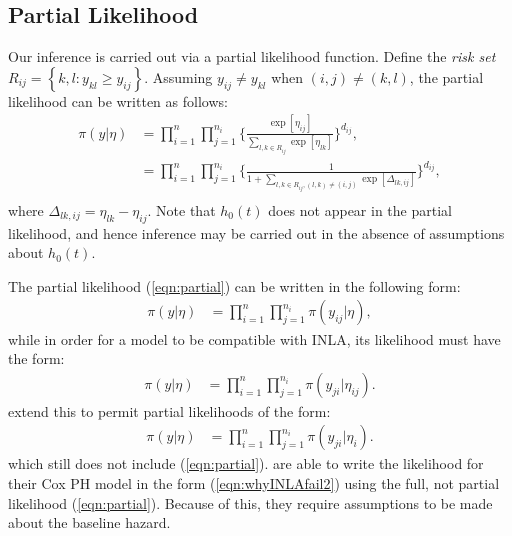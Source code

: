 \documentclass[ba]{imsart}
\begin{document}
\subsection{Partial Likelihood}

Our inference is carried out via a partial likelihood function. Define the \textit{risk set} $R_{ij} = \left\{k,l : y_{kl} \geq y_{ij}\right\}$. Assuming $y_{ij} \neq y_{kl}$ when $(i,j) \neq (k,l)$, the partial likelihood can be written as follows: 
\begin{equation}\begin{aligned}\label{eqn:partial}
\pi(y|\eta) &= \prod_{i=1}^{n}\prod_{j=1}^{n_{i}} \bigg\{\frac{\exp[\eta_{ij}]}{{\sum_{l,k\in R_{ij}}^{}\exp[\eta_{lk}]}}\bigg \}^{d_{ij}} , \\
&= \prod_{i=1}^{n}\prod_{j=1}^{n_{i}} \bigg\{\frac{1}{{1 + \sum_{l,k\in R_{ij} , (l,k) \neq (i,j)}\exp[\Delta_{lk,ij}]}}\bigg \}^{d_{ij}} , \\
\end{aligned}\end{equation}
where $\Delta_{lk,ij} = \eta_{lk} - \eta_{ij}$. Note that $h_{0}(t)$ does not appear in the partial likelihood, and hence inference may be carried out in the absence of assumptions about $h_{0}(t)$. 

The partial likelihood (\ref{eqn:partial}) can be written in the following form:
\begin{equation}\begin{aligned}\label{eqn:whyINLAfail1}
\pi(y|\eta) &= \prod_{i=1}^{n}\prod_{j=1}^{n_{i}} \pi(y_{ij}|\eta),
\end{aligned}\end{equation}
while in order for a model to be compatible with INLA, its likelihood must have the form:
\begin{equation}\begin{aligned}\label{eqn:whyINLAfail2}
\pi(y|\eta) &= \prod_{i=1}^{n}\prod_{j=1}^{n_{i}} \pi(y_{ji}|\eta_{ij}).
\end{aligned}\end{equation}
\cite{casecross} extend this to permit partial likelihoods of the form:
\begin{equation}\begin{aligned}\label{eqn:casecrosslik}
\pi(y|\eta) &= \prod_{i=1}^{n}\prod_{j=1}^{n_{i}} \pi(y_{ji}|\eta_{i}).
\end{aligned}\end{equation}
which still does not include (\ref{eqn:partial}). \cite{inlacoxph} are able to write the likelihood for their Cox PH model in the form (\ref{eqn:whyINLAfail2}) using the full, not partial likelihood (\ref{eqn:partial}). Because of this, they require assumptions to be made about the baseline hazard.
\end{document}
